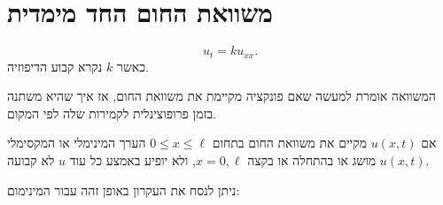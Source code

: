 \documentclass{tstextbook}
\begin{document}
\section{משוואת החום החד מימדית}

\begin{definition}
$$u_{t}=k u_{x x}.$$
כאשר \(k\) נקרא קבוע הדיפוזיה. 

\end{definition}
\begin{remark}
המשוואה אומרת למעשה שאם פונקציה מקיימת את משוואת החום, אז איך שהיא משתנה בזמן פרופוצינלית לקמירות שלה לפי המקום. 

\end{remark}
\begin{proposition}
אם \(u(x,t)\) מקיים את משוואת החום בתחום \(0\leq x\leq \ell\) הערך המינימלי או המקסימלי \(u(x,t)\) מושג או בהתחלה או בקצה \(x=0,\ell\), ולא יופיע באמצע כל עוד \(u\) לא קבועה.

\end{proposition}
ניתן לנסח את העקרון באופן זהה עבור המינימום:
\end{document}
